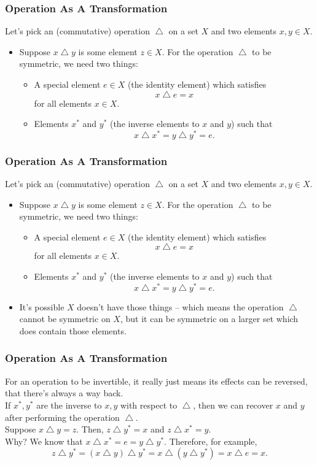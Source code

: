 \documentclass[aspectratio=169,11pt,usenames,dvipsnames,handout]{beamer}
\DeclareMathOperator{\tng}{\triangle}
\begin{document}
\begin{frame}
 \frametitle{Operation As A Transformation}
 Let's pick an (commutative) operation $\tng$ on a set $X$ and two elements $x,y
 \in X$.
 \begin{itemize}
  \item Suppose $x \tng y$ is some element $z \in X$. For the operation $\tng$
   to be \alert{symmetric}, we need two things:
  \begin{itemize}[label=\textemdash]
   \item A special element $e \in X$ (the \alert{identity} element) which
    satisfies
    \[
     x \tng e = x
    \]
    for all elements $x \in X$.
   \item Elements $x^{*}$ and $y^{*}$ (the \alert{inverse} elements to $x$ and
    $y$) such that
    \[
      x \tng x^{*} = y \tng y^{*} = e.
    \]
  \end{itemize}
 \end{itemize}
\end{frame}

\begin{frame}
 \frametitle{Operation As A Transformation}
 Let's pick an (commutative) operation $\tng$ on a set $X$ and two elements $x,y
 \in X$.
 \begin{itemize}
  \item Suppose $x \tng y$ is some element $z \in X$. For the operation $\tng$
   to be \alert{symmetric}, we need two things:
  \begin{itemize}[label=\textemdash]
   \item A special element $e \in X$ (the \alert{identity} element) which
    satisfies
    \[
     x \tng e = x
    \]
    for all elements $x \in X$. 
   \item Elements $x^{*}$ and $y^{*}$ (the \alert{inverse} elements to $x$ and
    $y$) such that
    \[
      x \tng x^{*} = y \tng y^{*} = e.
    \]
  \end{itemize}
 \item It's possible $X$ doesn't have those things -- which means the operation
  $\tng$ cannot be symmetric \alert{on $X$}, but it can be symmetric on a larger
  set which does contain those elements.
 \end{itemize}
\end{frame}

\begin{frame}
 \frametitle{Operation As A Transformation}
 For an operation to be invertible, it really just means its \alert{effects can
 be reversed}, that there's always a way back.\pause\\
 If $x^{*}, y^{*}$ are the inverse to $x,y$ with respect to $\tng$, then we can
 \alert{recover} $x$ and $y$ after performing the operation $\tng$.\pause\\
 Suppose $x \tng y = z$. Then, $z \tng y^{*} = x$ and $z \tng x^* = y$.\pause\\
 Why? We know that $x \tng x^{*} = e = y \tng y^{*}$. \pause
 Therefore, for example,
 \[
  z \tng y^{*} = (x \tng y) \tng y^{*} = x \tng (y \tng y^{*}) = x \tng e = x.
 \]
\end{frame}
\end{document}
